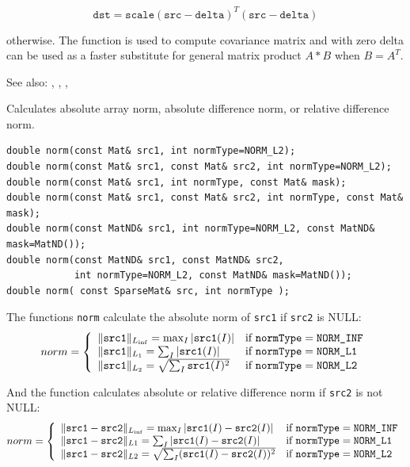\[
\texttt{dst}=\texttt{scale} (\texttt{src}-\texttt{delta})^T (\texttt{src}-\texttt{delta})
\]

otherwise. The function is used to compute covariance matrix and with zero delta can be used as a faster substitute for general matrix product $A*B$ when $B=A^T$.

See also: , , , 


\label{norm}
Calculates absolute array norm, absolute difference norm, or relative difference norm.

\begin{lstlisting}
double norm(const Mat& src1, int normType=NORM_L2);
double norm(const Mat& src1, const Mat& src2, int normType=NORM_L2);
double norm(const Mat& src1, int normType, const Mat& mask);
double norm(const Mat& src1, const Mat& src2, int normType, const Mat& mask);
double norm(const MatND& src1, int normType=NORM_L2, const MatND& mask=MatND());
double norm(const MatND& src1, const MatND& src2,
            int normType=NORM_L2, const MatND& mask=MatND());
double norm( const SparseMat& src, int normType );
\end{lstlisting}
\begin{description}
\end{description}

The functions \texttt{norm} calculate the absolute norm of \texttt{src1} if \texttt{src2} is NULL:
\[
norm = \left\{ \begin{array}{l l} \|\texttt{src1}\|_{L_{\inf}}    = \max_I |\texttt{src1}(I)| & \mbox{if $\texttt{normType} = \texttt{NORM\_INF}$}\\ \|\texttt{src1}\|_{L_1} = \sum_I |\texttt{src1}(I)| & \mbox{if $\texttt{normType} = \texttt{NORM\_L1}$}\\ \|\texttt{src1}\|_{L_2} = \sqrt{\sum_I \texttt{src1}(I)^2} & \mbox{if $\texttt{normType} = \texttt{NORM\_L2}$}\\ \end{array} \right.
\]

And the function calculates absolute or relative difference norm if \texttt{src2} is not NULL:
\[
norm = \left\{ \begin{array}{l l} \|\texttt{src1}-\texttt{src2}\|_{L_{\inf}}    = \max_I |\texttt{src1}(I) - \texttt{src2}(I)| & \mbox{if $\texttt{normType} = \texttt{NORM\_INF}$}\\ \|\texttt{src1}-\texttt{src2}\|_{L1} = \sum_I |\texttt{src1}(I) - \texttt{src2}(I)| & \mbox{if $\texttt{normType} = \texttt{NORM\_L1}$}\\ \|\texttt{src1}-\texttt{src2}\|_{L2} = \sqrt{\sum_I (\texttt{src1}(I) - \texttt{src2}(I))^2} & \mbox{if $\texttt{normType} = \texttt{NORM\_L2}$}\\ \end{array} \right.
\]

